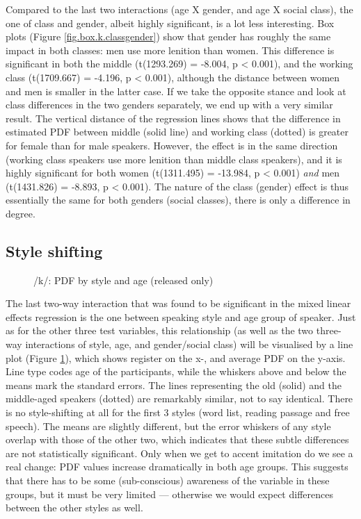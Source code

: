 Compared to the last two interactions (age X gender, and age X social class), the one of class and gender, albeit highly significant, is a lot less interesting.
Box plots (Figure \ref{fig.box.k.classgender}) show that gender has roughly the same impact in both classes: men use more lenition than women.
This difference is significant in both the middle (t(1293.269) = -8.004, p < 0.001), and the working class (t(1709.667) = -4.196, p < 0.001), although the distance between women and men is smaller in the latter case.
If we take the opposite stance and look at class differences in the two genders separately, we end up with a very similar result.
The vertical distance of the regression lines shows that the difference in estimated PDF between middle (solid line) and working class (dotted) is greater for female than for male speakers.
However, the effect is in the same direction (working class speakers use more lenition than middle class speakers), and it is highly significant for both women (t(1311.495) = -13.984, p < 0.001) \emph{and} men (t(1431.826) = -8.893, p < 0.001).
The nature of the class (gender) effect is thus essentially the same for both genders (social classes), there is only a difference in degree.

\subsection{Style shifting}
\label{sec.prod.res.con.k.shifting}

\begin{figure}[h]
	\centering
		\resizebox{0.5\linewidth}{!}{} 
	\caption{/k/: PDF by style and age (released only)}
	\label{fig.line.k.tot}
\end{figure}

The last two-way interaction that was found to be significant in the mixed linear effects regression is the one between speaking style and age group of speaker.
Just as for the other three test variables, this relationship (as well as the two three-way interactions of style, age, and gender/social class) will be visualised by a line plot (Figure \ref{fig.line.k.tot}), which shows register on the x-, and average PDF on the y-axis.
Line type codes age of the participants, while the whiskers above and below the means mark the standard errors.
The lines representing the old (solid) and the middle-aged speakers (dotted) are remarkably similar, not to say identical.
There is no style-shifting at all for the first 3 styles (word list, reading passage and free speech).
The means are slightly different, but the error whiskers of any style overlap with those of the other two, which indicates that these subtle differences are not statistically significant.
Only when we get to accent imitation do we see a real change: PDF values increase dramatically in both age groups.
This suggests that there has to be some (sub-conscious) awareness of the variable in these groups, but it must be very limited --- otherwise we would expect differences between the other styles as well.

